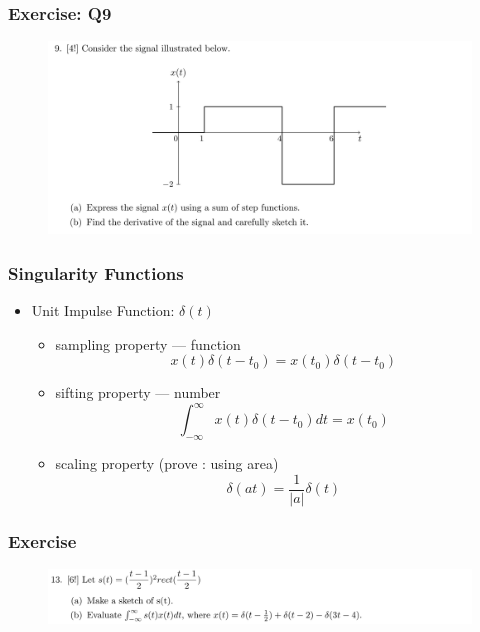 \documentclass{beamer}
\begin{document}
\begin{frame}
    \frametitle{Exercise: Q9}
    \begin{figure}
        \includegraphics[width=0.9\linewidth]{hw1_q9}
    \end{figure}

    \bigskip
    \bigskip
    \bigskip
    \bigskip
    \bigskip
    \bigskip
    \bigskip
    \bigskip
\end{frame}
\begin{frame}
\frametitle{Singularity Functions}
\begin{itemize}

\item Unit Impulse Function: $\delta(t)$ 
\begin{itemize}
    \item sampling property --- function \[ x(t)\delta(t - t_0) = x(t_0)\delta(t-t_0) \] 
    \item sifting property --- number \[ \int_{-\infty}^{\infty} x(t)\delta(t - t_0) dt = x(t_0)\] 
    \item scaling property (prove : using area) \[ \delta(at) = \frac{1}{|a|} \delta(t)\]     
\end{itemize}


\bigskip
    \bigskip
    \bigskip

\end{itemize}
\end{frame}

\begin{frame}
    \frametitle{Exercise}
    \begin{figure}
        \includegraphics[width=1\linewidth]{hw1_q13}
    \end{figure}

    \bigskip
    \bigskip
    \bigskip
    \bigskip
    \bigskip
    \bigskip
    \bigskip
    \bigskip
\end{frame}
\end{document}
